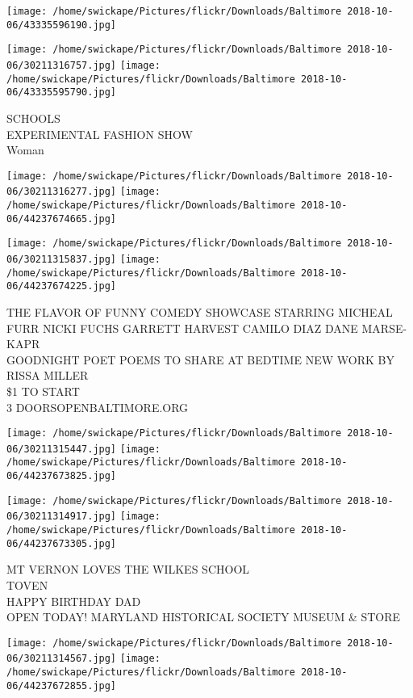 \documentclass[10pt,letterpaper]{article}
\begin{document}
\texttt{[image: /home/swickape/Pictures/flickr/Downloads/Baltimore 2018-10-06/43335596190.jpg]}

\vspace{0.25in}
\texttt{[image: /home/swickape/Pictures/flickr/Downloads/Baltimore 2018-10-06/30211316757.jpg]}
\texttt{[image: /home/swickape/Pictures/flickr/Downloads/Baltimore 2018-10-06/43335595790.jpg]}

SCHOOLS\\
EXPERIMENTAL FASHION SHOW\\
Woman\\
\pagebreak

\texttt{[image: /home/swickape/Pictures/flickr/Downloads/Baltimore 2018-10-06/30211316277.jpg]}
\texttt{[image: /home/swickape/Pictures/flickr/Downloads/Baltimore 2018-10-06/44237674665.jpg]}

\texttt{[image: /home/swickape/Pictures/flickr/Downloads/Baltimore 2018-10-06/30211315837.jpg]}
\texttt{[image: /home/swickape/Pictures/flickr/Downloads/Baltimore 2018-10-06/44237674225.jpg]}

THE FLAVOR OF FUNNY COMEDY SHOWCASE STARRING MICHEAL FURR NICKI FUCHS GARRETT HARVEST CAMILO DIAZ DANE MARSE{-}KAPR\\
GOODNIGHT POET POEMS TO SHARE AT BEDTIME NEW WORK BY RISSA MILLER\\
\$1 TO START\\
3 DOORSOPENBALTIMORE.ORG\\
\pagebreak

\texttt{[image: /home/swickape/Pictures/flickr/Downloads/Baltimore 2018-10-06/30211315447.jpg]}
\texttt{[image: /home/swickape/Pictures/flickr/Downloads/Baltimore 2018-10-06/44237673825.jpg]}

\texttt{[image: /home/swickape/Pictures/flickr/Downloads/Baltimore 2018-10-06/30211314917.jpg]}
\texttt{[image: /home/swickape/Pictures/flickr/Downloads/Baltimore 2018-10-06/44237673305.jpg]}

MT VERNON LOVES THE WILKES SCHOOL\\
TOVEN\\
HAPPY BIRTHDAY DAD\\
OPEN TODAY!  MARYLAND HISTORICAL SOCIETY MUSEUM \& STORE\\
\pagebreak

\texttt{[image: /home/swickape/Pictures/flickr/Downloads/Baltimore 2018-10-06/30211314567.jpg]}
\texttt{[image: /home/swickape/Pictures/flickr/Downloads/Baltimore 2018-10-06/44237672855.jpg]}
\end{document}
